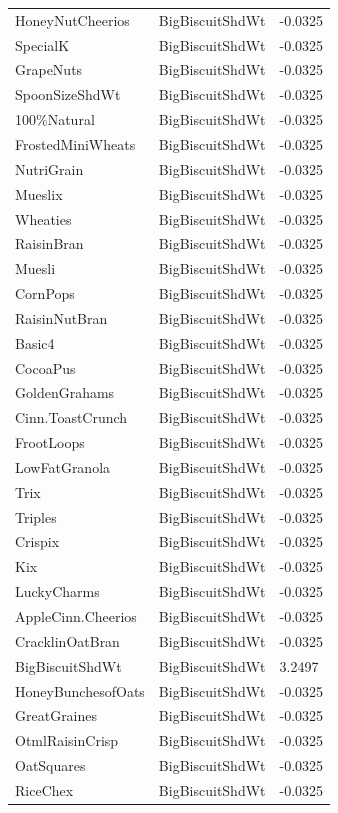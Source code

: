 \begin{table}[!htbp]
\begin{tabular}{lll}
HoneyNutCheerios & BigBiscuitShdWt & -0.0325
\\
SpecialK & BigBiscuitShdWt & -0.0325
\\
GrapeNuts & BigBiscuitShdWt & -0.0325
\\
SpoonSizeShdWt & BigBiscuitShdWt & -0.0325
\\
100\%Natural & BigBiscuitShdWt & -0.0325
\\
FrostedMiniWheats & BigBiscuitShdWt & -0.0325
\\
NutriGrain & BigBiscuitShdWt & -0.0325
\\
Mueslix & BigBiscuitShdWt & -0.0325
\\
Wheaties & BigBiscuitShdWt & -0.0325
\\
RaisinBran & BigBiscuitShdWt & -0.0325
\\
Muesli & BigBiscuitShdWt & -0.0325
\\
CornPops & BigBiscuitShdWt & -0.0325
\\
RaisinNutBran & BigBiscuitShdWt & -0.0325
\\
Basic4 & BigBiscuitShdWt & -0.0325
\\
CocoaPus & BigBiscuitShdWt & -0.0325
\\
GoldenGrahams & BigBiscuitShdWt & -0.0325
\\
Cinn.ToastCrunch & BigBiscuitShdWt & -0.0325
\\
FrootLoops & BigBiscuitShdWt & -0.0325
\\
LowFatGranola & BigBiscuitShdWt & -0.0325
\\
Trix & BigBiscuitShdWt & -0.0325
\\
Triples & BigBiscuitShdWt & -0.0325
\\
Crispix & BigBiscuitShdWt & -0.0325
\\
Kix & BigBiscuitShdWt & -0.0325
\\
LuckyCharms & BigBiscuitShdWt & -0.0325
\\
AppleCinn.Cheerios & BigBiscuitShdWt & -0.0325
\\
CracklinOatBran & BigBiscuitShdWt & -0.0325
\\
BigBiscuitShdWt & BigBiscuitShdWt & 3.2497
\\
HoneyBunchesofOats & BigBiscuitShdWt & -0.0325
\\
GreatGraines & BigBiscuitShdWt & -0.0325
\\
OtmlRaisinCrisp & BigBiscuitShdWt & -0.0325
\\
OatSquares & BigBiscuitShdWt & -0.0325
\\
RiceChex & BigBiscuitShdWt & -0.0325

\end{tabular}
\end{table}
